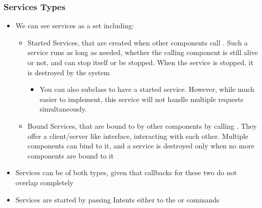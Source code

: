 \begin{frame}
  \frametitle{Services Types}
  \begin{itemize}
  \item We can see services as a set including:
    \begin{itemize}
    \item Started Services, that are created when other components
      call . Such a service runs as long as needed,
      whether the calling component is still alive or not, and
      can stop itself or be stopped. When the service is stopped, it
      is destroyed by the system
      \begin{itemize}
      \item You can also subclass  to have a
        started service. However, while much easier to implement, this
        service will not handle multiple requests simultaneously.
      \end{itemize}
    \item Bound Services, that are bound to by other components by
      calling . They offer a client/server like
      interface, interacting with each other. Multiple components can
      bind to it, and a service is destroyed only when no more
      components are bound to it
    \end{itemize}
  \item Services can be of both types, given that callbacks for these two do
    not overlap completely
  \item Services are started by passing Intents either to the
     or  commands
  \end{itemize}
\end{frame}

